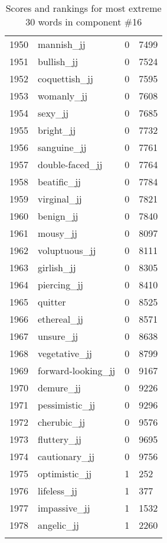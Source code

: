 \begin{longtable}[!htbp]{| rlr@{.}l |}
    1950 & mannish\_jj & 0 & 7499 \\
    1951 & bullish\_jj & 0 & 7524 \\
    1952 & coquettish\_jj & 0 & 7595 \\
    1953 & womanly\_jj & 0 & 7608 \\
    1954 & sexy\_jj & 0 & 7685 \\
    1955 & bright\_jj & 0 & 7732 \\
    1956 & sanguine\_jj & 0 & 7761 \\
    1957 & double-faced\_jj & 0 & 7764 \\
    1958 & beatific\_jj & 0 & 7784 \\
    1959 & virginal\_jj & 0 & 7821 \\
    1960 & benign\_jj & 0 & 7840 \\
    1961 & mousy\_jj & 0 & 8097 \\
    1962 & voluptuous\_jj & 0 & 8111 \\
    1963 & girlish\_jj & 0 & 8305 \\
    1964 & piercing\_jj & 0 & 8410 \\
    1965 & quitter & 0 & 8525 \\
    1966 & ethereal\_jj & 0 & 8571 \\
    1967 & unsure\_jj & 0 & 8638 \\
    1968 & vegetative\_jj & 0 & 8799 \\
    1969 & forward-looking\_jj & 0 & 9167 \\
    1970 & demure\_jj & 0 & 9226 \\
    1971 & pessimistic\_jj & 0 & 9296 \\
    1972 & cherubic\_jj & 0 & 9576 \\
    1973 & fluttery\_jj & 0 & 9695 \\
    1974 & cautionary\_jj & 0 & 9756 \\
    1975 & optimistic\_jj & 1 & 252 \\
    1976 & lifeless\_jj & 1 & 377 \\
    1977 & impassive\_jj & 1 & 1532 \\
    1978 & angelic\_jj & 1 & 2260 \\
    \hline
    \caption{Scores and rankings for most extreme 30 words in component \#16} \\
\end{longtable}
